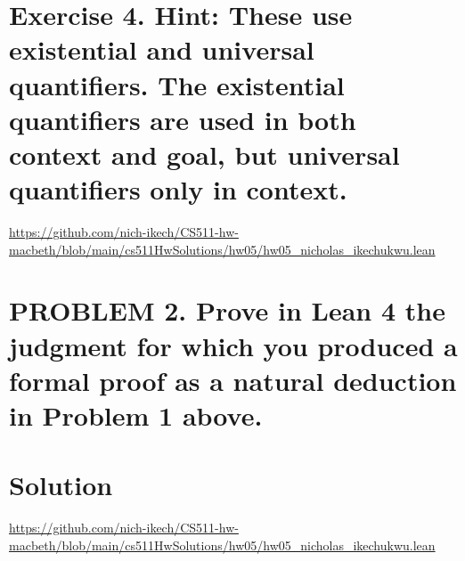 \documentclass{article}
\begin{document}
\section*{Exercise 4. Hint: These use existential and universal quantifiers. The existential quantifiers are used in both
context and goal, but universal quantifiers only in context.}

\url{https://github.com/nich-ikech/CS511-hw-macbeth/blob/main/cs511HwSolutions/hw05/hw05_nicholas_ikechukwu.lean}

\newpage

\section*{PROBLEM 2. Prove in Lean 4 the judgment for which you produced a formal proof as a natural
deduction in Problem 1 above.}
\section*{Solution}

\url{https://github.com/nich-ikech/CS511-hw-macbeth/blob/main/cs511HwSolutions/hw05/hw05_nicholas_ikechukwu.lean}
\end{document}
